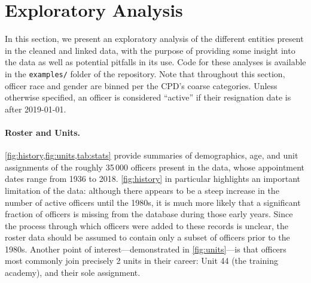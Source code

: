 
\section{Exploratory Analysis} \label{sec:analysis}

In this section, we present an exploratory analysis of the different entities
present in the cleaned and linked data, with the purpose of providing some
insight into the data as well as potential pitfalls in its use. Code for these
analyses is available in the \texttt{examples/} folder of the repository.  Note
that throughout this section, officer race and gender are binned per the CPD's
coarse categories.  Unless otherwise specified, an officer is considered
``active'' if their resignation date is after 2019-01-01. 

\paragraph{Roster and Units.} \cref{fig:history,fig:units,tab:stats} 
provide summaries of demographics, age, and unit assignments
of the roughly 35\,000 officers present in the data,
whose appointment dates range from 1936 to 2018.
\cref{fig:history} in particular highlights an important limitation of the data:
although there appears to be a steep increase in the number of active officers
until the 1980s, it is much more likely that a significant fraction of
officers is missing from the database during those early years.
Since the process through which officers were added to these records is unclear,
the roster data should be assumed to contain only a subset of officers prior to 
the 1980s. Another point of interest---demonstrated in \cref{fig:units}---is that officers
most commonly join precisely 2 units in their career: Unit 44 (the training academy),
and their sole assignment.
 
